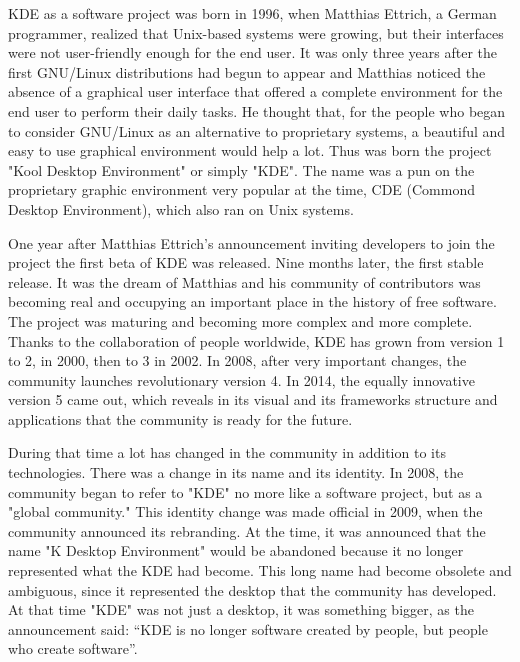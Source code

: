 

\noindent{}KDE as a software project was born in 1996, when Matthias Ettrich, a German programmer, realized that Unix-based systems were growing, but their interfaces were not user-friendly enough for the end user. It was only three years after the first GNU/Linux distributions had begun to appear and Matthias noticed the absence of a graphical user interface that offered a complete environment for the end user to perform their daily tasks. He thought that, for the people who began to consider GNU/Linux as an alternative to proprietary systems, a beautiful and easy to use graphical environment would help a lot. Thus was born the project "Kool Desktop Environment" or simply "KDE". The name was a pun on the proprietary graphic environment very popular at the time, CDE (Commond Desktop Environment), which also ran on Unix systems.

One year after Matthias Ettrich's announcement inviting developers to join the project the first beta of KDE was released. Nine months later, the first stable release. It was the dream of Matthias and his community of contributors was becoming real and occupying an important place in the history of free software. The project was maturing and becoming more complex and more complete. Thanks to the collaboration of people worldwide, KDE has grown from version 1 to 2, in 2000, then to 3 in 2002. In 2008, after very important changes, the community launches revolutionary version 4. In 2014, the equally innovative version 5 came out, which reveals in its visual and its frameworks structure and applications that the community is ready for the future.

During that time a lot has changed in the community in addition to its technologies. There was a change in its name and its identity. In 2008, the community began to refer to "KDE" no more like a software project, but as a "global community." This identity change was made official in 2009, when the community announced its rebranding. At the time, it was announced that the name "K Desktop Environment" would be abandoned because it no longer represented what the KDE had become. This long name had become obsolete and ambiguous, since it represented the desktop that the community has developed. At that time "KDE" was not just a desktop, it was something bigger, as the announcement said: “KDE is no longer software created by people, but people who create software”. 

